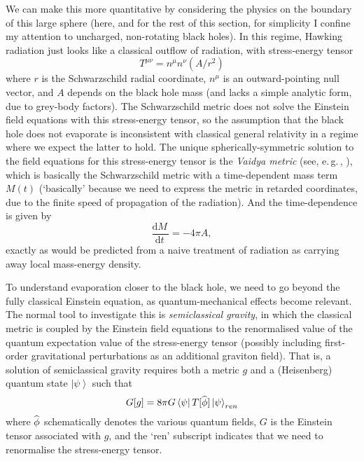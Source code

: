 \documentclass[12pt]{article}
\newcommand{\egc}{\mbox{e.\,g.\,}}
\newcommand{\dr}[1]{\ensuremath{\mathrm{d} #1\,}}
\newcommand{\dbd}[2]{\ensuremath{\frac{\dr{#1}}{\dr{#2}}}}
\newcommand{\ket}[1]{\ensuremath{\left|  #1 \right\rangle}}
\newcommand{\bra}[1]{\ensuremath{\left\langle #1 \right|}}
\newcommand{\matel}[3]{\ensuremath{\bra{#1} #2 \ket{#3}}}
\newcommand{\op}[1]{\ensuremath{\widehat{\textsf{\ensuremath{#1}}}}}
\newcommand{\be}{\begin{equation}}
\newcommand{\ee}{\end{equation}}
\begin{document}
We can make this more quantitative by considering the physics on the boundary of this large sphere (here, and for the rest of this section, for simplicity I confine my attention to uncharged, non-rotating black holes). In this regime, Hawking radiation just looks like a classical outflow of radiation, with stress-energy tensor
\be
T^{\mu\nu}=n^\mu n^\nu (A/r^2)
\ee
where $r$ is the Schwarzschild radial coordinate, $n^\mu$ is an outward-pointing null vector, and $A$ depends on the black hole mass (and lacks a simple analytic form, due to grey-body factors). The Schwarzschild metric does not solve the Einstein field equations with this stress-energy tensor, so the assumption that the black hole does not evaporate is inconsistent with classical general relativity in a regime where we expect the latter to hold. The unique spherically-symmetric solution to the field equations for this stress-energy tensor is the \emph{Vaidya metric} (see, \egc, ), which is basically the Schwarzschild metric with a time-dependent mass term $M(t)$ (`basically' because we need to express the metric in retarded coordinates, due to the finite speed of propagation of the radiation). And the time-dependence is given by
\be
\dbd{M}{t} = - 4\pi A,
\ee
exactly as would be predicted from a naive treatment of radiation as carrying away local mass-energy density.

To understand evaporation closer to the black hole, we need to go beyond the fully classical Einstein equation, as quantum-mechanical effects become relevant. The normal tool to investigate this is \emph{semiclassical gravity}, in which the classical metric is coupled by the Einstein field equations to the renormalised value of the quantum expectation value of the stress-energy tensor (possibly including first-order gravitational perturbations as an additional graviton field). That is, a solution of semiclassical gravity requires both a metric $g$ and a (Heisenberg) quantum state $\ket{\psi}$ such that
\be
G[g] = 8 \pi G \matel{\psi}{T[\op{\phi}]}{\psi}_{ren}
\ee
where $\op{\phi}$ schematically denotes the various quantum fields, $G$ is the Einstein tensor associated with $g$, and the `ren' subscript indicates that we need to renormalise the stress-energy tensor.
\end{document}
